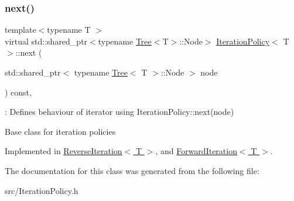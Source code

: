 \subsubsection{\texorpdfstring{next()}{next()}}
{\footnotesize\ttfamily template$<$typename T $>$ \\
virtual std\+::shared\+\_\+ptr$<$typename \hyperlink{classTree}{Tree}$<$T$>$\+::Node$>$ \hyperlink{classIterationPolicy}{Iteration\+Policy}$<$ T $>$\+::next (\begin{DoxyParamCaption}\item[{std\+::shared\+\_\+ptr$<$ typename \hyperlink{classTree}{Tree}$<$ T $>$\+::Node $>$}]{node }\end{DoxyParamCaption}) const\hspace{0.3cm}{\ttfamily [pure virtual]}, {\ttfamily [noexcept]}}



\+: Defines behaviour of iterator using Iteration\+Policy\+::next(node) 

Base class for iteration policies 

Implemented in \hyperlink{classReverseIteration_a3ca61dfcdf068fcc2905106a800c96fb}{Reverse\+Iteration$<$ T $>$}, and \hyperlink{classForwardIteration_aec16f756354bad563a57da6157448203}{Forward\+Iteration$<$ T $>$}.



The documentation for this class was generated from the following file\+:\begin{DoxyCompactItemize}
\item 
src/Iteration\+Policy.\+h\end{DoxyCompactItemize}
